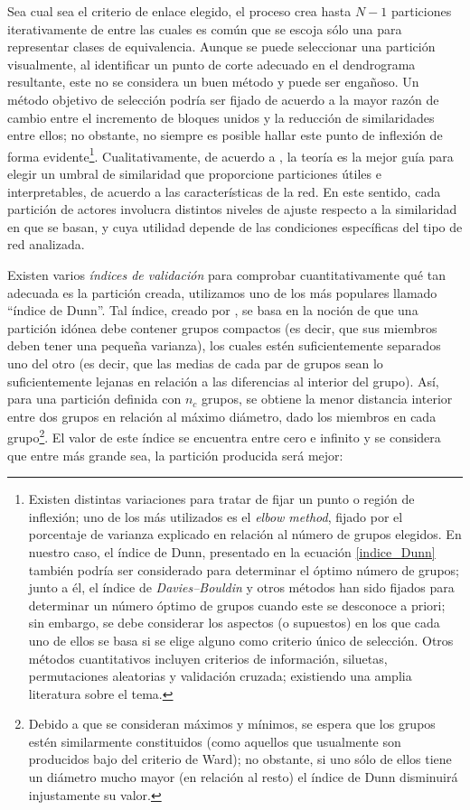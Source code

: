 \documentclass[letterpaper, 11pt]{book}
\theoremstyle{definition}
\theoremstyle{remark}
\begin{document}
Sea cual sea el criterio de enlace elegido, el proceso crea hasta $N-1$ particiones iterativamente de entre las cuales es común que se escoja sólo una para representar clases de equivalencia. 
Aunque se puede seleccionar una partición visualmente, al identificar un punto de corte adecuado en el dendrograma resultante, este no se considera un buen método y puede ser engañoso. 
Un método objetivo de selección podría ser fijado de acuerdo a la mayor razón de cambio entre el incremento de bloques unidos y la reducción de similaridades entre ellos; no obstante, no siempre es posible hallar este punto de inflexión de forma evidente\footnote{
    Existen distintas variaciones para tratar de fijar un punto o región de inflexión; uno de los más utilizados es el \emph{elbow method}, fijado por el porcentaje de varianza explicado en relación al número de grupos elegidos. 
    En nuestro caso, el índice de Dunn, presentado en la ecuación \ref{indice_Dunn} también podría ser considerado para determinar el óptimo número de grupos; junto a él, el índice de \emph{Davies–Bouldin} y otros métodos han sido fijados para determinar un número óptimo de grupos cuando este se desconoce a priori; sin embargo, se debe considerar los aspectos (o supuestos) en los que cada uno de ellos se basa si se elige alguno como criterio único de selección. 
    Otros métodos cuantitativos incluyen criterios de información, siluetas, permutaciones aleatorias y validación cruzada; existiendo una amplia literatura sobre el tema. 
}. 
Cualitativamente, de acuerdo a \citet{1994_Wasserman_SNA}, la teoría es la mejor guía para elegir un umbral de similaridad que proporcione particiones útiles e interpretables, de acuerdo a las características de la red. 
En este sentido, cada partición de actores involucra distintos niveles de ajuste respecto a la similaridad en que se basan, y cuya utilidad depende de las condiciones específicas del tipo de red analizada. 



Existen varios \emph{índices de validación} para comprobar cuantitativamente qué tan adecuada es la partición creada, utilizamos uno de los más populares llamado ``índice de Dunn''. 
Tal índice, creado por \citet{1973_Dunn_Clusters}, se basa en la noción de que una partición idónea debe contener grupos compactos (es decir, que sus miembros deben tener una pequeña varianza), los cuales estén suficientemente separados uno del otro (es decir, que las medias de cada par de grupos sean lo suficientemente lejanas en relación a las diferencias al  interior del grupo). 
Así, para una partición definida con $n_c$ grupos, se obtiene la menor distancia interior entre dos grupos en relación al máximo diámetro, dado los miembros en cada grupo\footnote{
    Debido a que se consideran máximos y mínimos, se espera que los grupos estén similarmente constituidos (como aquellos que usualmente son producidos bajo del criterio de Ward); no obstante, si uno sólo de ellos tiene un diámetro mucho mayor (en relación al resto) el índice de Dunn disminuirá injustamente su valor. 
}. 
El valor de este índice se encuentra entre cero e infinito y se considera que entre más grande sea, la partición producida será mejor: 
\end{document}
